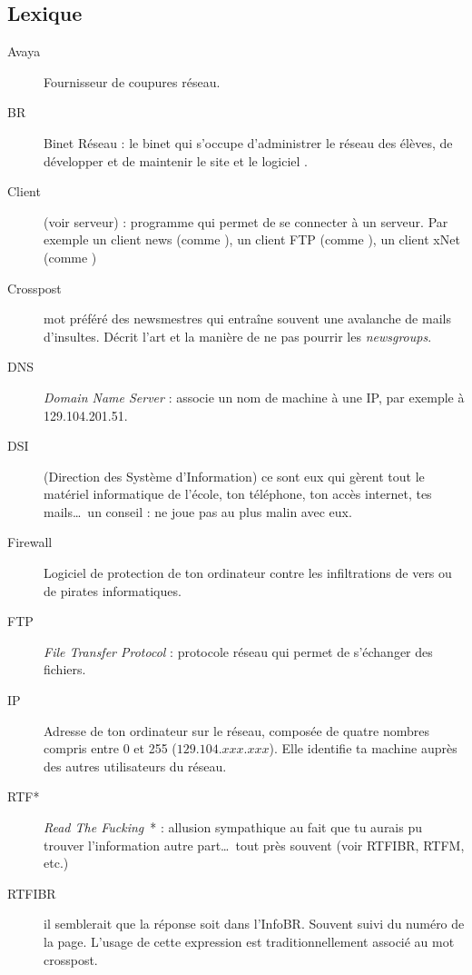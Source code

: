 
\subsection{Lexique}

\begin{description}
  \item[Avaya] Fournisseur de coupures réseau.
  \item[BR] Binet Réseau : le binet qui s'occupe d'administrer le réseau des élèves, de développer et de maintenir le site  et le logiciel .
  \item[Client] (voir serveur) : programme qui permet de se connecter à un serveur. Par exemple un client news (comme ), un client FTP (comme ), un client xNet (comme )
  \item[Crosspost] mot préféré des newsmestres qui entraîne souvent une avalanche de mails d'insultes. Décrit l'art et la manière de ne pas pourrir les \emph{newsgroups}.
  \item[DNS] \emph{Domain Name Server} : associe un nom de machine à une IP, par exemple  à 129.104.201.51.
  \item[DSI] (Direction des Système d'Information) ce sont eux qui gèrent tout le matériel informatique de l'école, ton téléphone, ton accès internet, tes mails\ldots\ un conseil : ne joue pas au plus malin avec eux.
  \item[Firewall] Logiciel de protection de ton ordinateur contre les infiltrations de vers ou de pirates informatiques.
  \item[FTP] \emph{File Transfer Protocol} : protocole réseau qui permet de s'échanger des fichiers.
  \item[IP] Adresse de ton ordinateur sur le réseau, composée de quatre nombres compris entre 0 et 255 ($129.104.xxx.xxx$). Elle identifie ta machine auprès des autres utilisateurs du réseau.
  \item[RTF*] \emph{Read The Fucking}\ * : allusion sympathique au fait que tu aurais pu trouver l'information autre part\ldots\ tout près souvent (voir RTFIBR, RTFM, etc.)
  \item[RTFIBR] il semblerait que la réponse soit dans l'InfoBR. Souvent suivi du numéro de la page. L'usage de cette expression est traditionnellement associé au mot crosspost.

\end{description}

